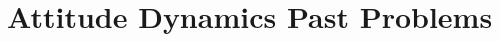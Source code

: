 \newcommand{\vif}[2]{{}^\mathcal{#2}\boldsymbol{#1}}
\newcommand{\dvif}[2]{\frac{{}^{\mathcal{#2}}d\boldsymbol{#1}}{dt}}
\newcommand{\v}[1]{\boldsymbol{#1}}
\newcommand{\dv}[1]{\dot{\v{#1}}}
\newcommand{\ddv}[1]{\ddot{\v{#1}}}
\newcommand{\uv}[1]{\hat{\v{#1}}}

\newcommand{\q}{\v{q}}
\newcommand{\qb}{\bar{\v{q}}}
\newcommand{\qbb}{\bar{\bar{\v{q}}}}




\maketitle

\section{Attitude Dynamics Past Problems}


